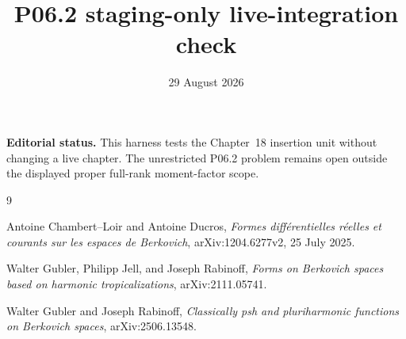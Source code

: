 \documentclass[11pt]{article}
\title{P06.2 staging-only live-integration check}
\author{}
\date{29 August 2026}
\begin{document}
\maketitle

\noindent
\textbf{Editorial status.}
This harness tests the Chapter~18 insertion unit without changing a live
chapter.  The unrestricted P06.2 problem remains open outside the displayed
proper full-rank moment-factor scope.



\begin{sloppypar}
\begin{thebibliography}{9}
\raggedright

Antoine Chambert--Loir and Antoine Ducros,
\emph{Formes diff\'erentielles r\'eelles et courants sur les espaces de
Berkovich}, arXiv:1204.6277v2, 25 July 2025.

Walter Gubler, Philipp Jell, and Joseph Rabinoff,
\emph{Forms on Berkovich spaces based on harmonic tropicalizations},
arXiv:2111.05741.

Walter Gubler and Joseph Rabinoff,
\emph{Classically psh and pluriharmonic functions on Berkovich spaces},
arXiv:2506.13548.

\end{thebibliography}
\end{sloppypar}
\end{document}
